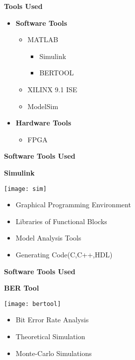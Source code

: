 \documentclass{beamer}
\begin{document}
\begin{frame}{\scriptsize \LARGE \centering \textbf{Tools Used}}
	
	\begin{itemize}
	\pause


\item \textbf{Software Tools}
\begin{itemize}
		\item MATLAB
		\begin{itemize}
		\pause
	\item Simulink
	\pause
	\item BERTOOL
	\end{itemize}
	\pause		
		\item XILINX 9.1 ISE
\pause
		\item ModelSim

	\end{itemize}
	\pause
\item \textbf{Hardware Tools}
	\begin{itemize}
	\pause
	\item FPGA
	\end{itemize}
	\end{itemize}
	\end{frame}

\begin{frame}{\scriptsize \LARGE \centering \textbf{Software Tools Used}}
\begin{block}{\textbf{Simulink}}
\begin{center}
\texttt{[image: sim]}
\end{center}
\begin{itemize}
\item Graphical Programming Environment
\item Libraries of Functional Blocks
\item Model Analysis Tools
\item Generating Code(C,C++,HDL)
\end{itemize}	
\end{block}
\end{frame}

\begin{frame}{\scriptsize \LARGE \centering \textbf{Software Tools Used}}
\begin{block}{\textbf{BER Tool}}
 \begin{center}
  \texttt{[image: bertool]}
 \end{center}
 \begin{itemize}
 \item Bit Error Rate Analysis
 \item Theoretical Simulation 
 \item Monte-Carlo Simulations
 \end{itemize}
 \end{block}
\end{frame}
\end{document}
